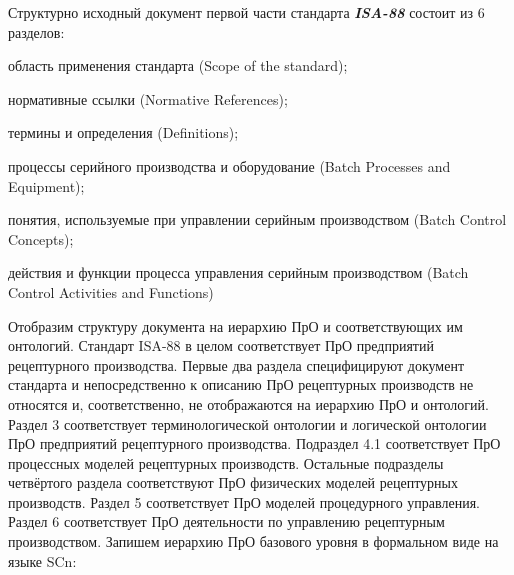 Структурно исходный документ первой части стандарта \textbf{\textit{ISA-88}} \cite{ISA88} состоит из 6 разделов:
\begin{textitemize}
    \item область применения стандарта (Scope of the standard);
    \item нормативные ссылки (Normative References);
    \item термины и определения (Definitions);
    \item процессы серийного производства и оборудование (Batch Processes and Equipment);
    \item понятия, используемые при управлении серийным производством (Batch Control Concepts);
    \item действия и функции процесса управления серийным производством (Batch Control Activities and Functions)
\end{textitemize}

Отобразим структуру документа на иерархию ПрО и соответствующих им онтологий. Стандарт ISA-88 в целом соответствует ПрО предприятий рецептурного производства. Первые два раздела специфицируют документ стандарта и непосредственно к описанию ПрО рецептурных производств не относятся и, соответственно, не отображаются на иерархию ПрО и онтологий. Раздел 3 соответствует терминологической онтологии и логической онтологии ПрО предприятий рецептурного производства. Подраздел 4.1 соответствует ПрО процессных моделей рецептурных производств. Остальные подразделы четвёртого раздела соответствуют ПрО физических моделей рецептурных производств. Раздел 5 соответствует ПрО моделей процедурного управления. Раздел 6 соответствует ПрО деятельности по управлению рецептурным производством.
Запишем иерархию ПрО базового уровня в формальном виде на языке SCn:

\begin{SCn}
\end{SCn}



